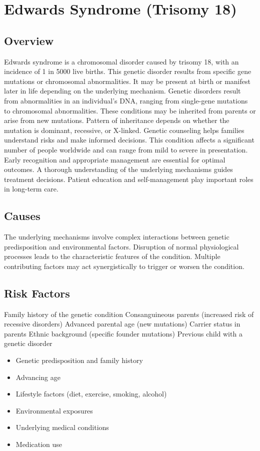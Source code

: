 \chapter{Edwards Syndrome (Trisomy 18)}
\label{sec:Edwards Syndrome}

\section{Overview}
Edwards syndrome is a chromosomal disorder caused by trisomy 18, with an incidence of 1 in 5000 live births. This genetic disorder results from specific gene mutations or chromosomal abnormalities. It may be present at birth or manifest later in life depending on the underlying mechanism. Genetic disorders result from abnormalities in an individual's DNA, ranging from single-gene mutations to chromosomal abnormalities. These conditions may be inherited from parents or arise from new mutations. Pattern of inheritance depends on whether the mutation is dominant, recessive, or X-linked. Genetic counseling helps families understand risks and make informed decisions. This condition affects a significant number of people worldwide and can range from mild to severe in presentation. Early recognition and appropriate management are essential for optimal outcomes. A thorough understanding of the underlying mechanisms guides treatment decisions. Patient education and self-management play important roles in long-term care.
\section{Causes}
The underlying mechanisms involve complex interactions between genetic predisposition and environmental factors. Disruption of normal physiological processes leads to the characteristic features of the condition. Multiple contributing factors may act synergistically to trigger or worsen the condition.
\section{Risk Factors}
Family history of the genetic condition Consanguineous parents (increased risk of recessive disorders) Advanced parental age (new mutations) Carrier status in parents Ethnic background (specific founder mutations) Previous child with a genetic disorder

\begin{itemize}[noitemsep]
  \item Genetic predisposition and family history
  \item Advancing age
  \item Lifestyle factors (diet, exercise, smoking, alcohol)
  \item Environmental exposures
  \item Underlying medical conditions
  \item Medication use
\end{itemize}

